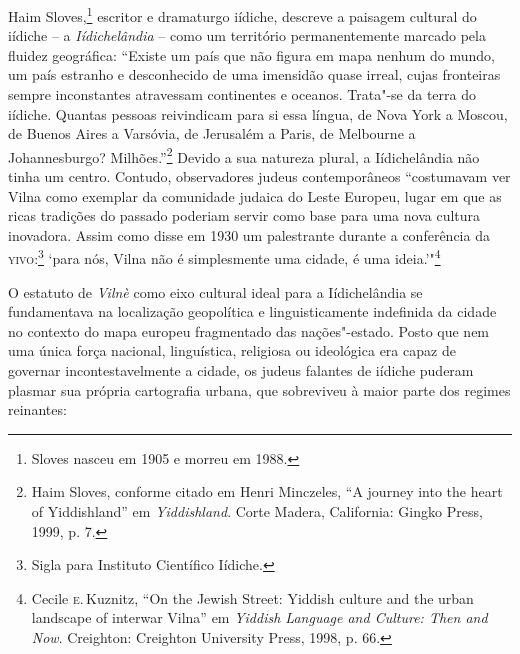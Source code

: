 Haim Sloves,\footnote{Sloves nasceu em 1905 e morreu em 1988.} escritor e dramaturgo iídiche, descreve a
paisagem cultural do iídiche -- a \textit{Iídichelândia} -- como um território
permanentemente marcado pela fluidez geográfica: ``Existe um país que
não figura em mapa nenhum do mundo, um país estranho e desconhecido de
uma imensidão quase irreal, cujas fronteiras sempre inconstantes
atravessam continentes e oceanos. Trata"-se da terra do iídiche. Quantas
pessoas reivindicam para si essa língua, de Nova York a Moscou, de
Buenos Aires a Varsóvia, de Jerusalém a Paris, de Melbourne a
Johannesburgo? Milhões.''\footnote{Haim Sloves, conforme citado em Henri Minczeles, ``A journey into the heart of Yiddishland'' em \textit{Yiddishland}. Corte Madera, California: Gingko Press, 1999, p. 7.} Devido a sua natureza plural, a Iídichelândia não tinha um centro. Contudo, observadores
judeus contemporâneos ``costumavam ver Vilna como exemplar da comunidade
judaica do Leste Europeu, lugar em que as ricas tradições do passado
poderiam servir como base para uma nova cultura inovadora. Assim como
disse em 1930 um palestrante durante a conferência da \textsc{yivo}:\footnote{Sigla para Instituto
Científico Iídiche.} `para nós, Vilna não é simplesmente uma cidade, é
uma ideia.'"\footnote{Cecile \textsc{e}.\,Kuznitz, ``On the Jewish Street: Yiddish culture and the urban landscape of interwar Vilna'' em \textit{Yiddish Language and Culture: Then and Now}. Creighton: Creighton University Press, 1998, p. 66.}

O estatuto de \textit{Vilnè} como eixo cultural ideal para a Iídichelândia se
fundamentava na localização geopolítica e linguisticamente indefinida da
cidade no contexto do mapa europeu fragmentado das nações"-estado. Posto
que nem uma única força nacional, linguística, religiosa ou ideológica
era capaz de governar incontestavelmente a cidade, os judeus falantes de
iídiche puderam plasmar sua própria cartografia urbana, que sobreviveu à
maior parte dos regimes reinantes:

